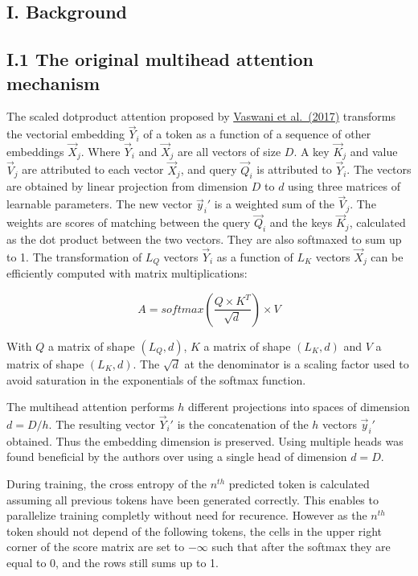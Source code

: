 \hypertarget{i.-background}{%
\subsection{I. Background}\label{i.-background}}

\hypertarget{i.1-the-original-multihead-attention-mechanism}{%
\subsection{I.1 The original multihead attention
mechanism}\label{i.1-the-original-multihead-attention-mechanism}}

The scaled dotproduct attention proposed by
\href{https://arxiv.org/abs/1706.03762}{Vaswani et al.~(2017)}
transforms the vectorial embedding \(\vec{Y}_i\) of a token as a
function of a sequence of other embeddings \(\vec{X}_j\). Where
\(\vec{Y}_i\) and \(\vec{X}_j\) are all vectors of size \(D\). A key
\(\vec{K}_j\) and value \(\vec{V}_j\) are attributed to each vector
\(\vec{X}_j\), and query \(\vec{Q}_i\) is attributed to \(\vec{Y}_i\).
The vectors are obtained by linear projection from dimension \(D\) to
\(d\) using three matrices of learnable parameters. The new vector
\(\vec{y}_i'\) is a weighted sum of the \(\vec{V}_j\). The weights are
scores of matching between the query \(\vec{Q}_i\) and the keys
\(\vec{K}_j\), calculated as the dot product between the two vectors.
They are also softmaxed to sum up to 1. The transformation of \(L_Q\)
vectors \(\vec{Y}_i\) as a function of \(L_K\) vectors \(\vec{X}_j\) can
be efficiently computed with matrix multiplications:

\[A = softmax\left(\frac{Q \times K^T}{\sqrt{d}}\right) \times V\]

With \(Q\) a matrix of shape \((L_Q, d)\), \(K\) a matrix of shape
\((L_K, d)\) and \(V\) a matrix of shape \((L_K, d)\). The \(\sqrt{d}\)
at the denominator is a scaling factor used to avoid saturation in the
exponentials of the softmax function.

The multihead attention performs \(h\) different projections into spaces
of dimension \(d = D/h\). The resulting vector \(\vec{Y}_i'\) is the
concatenation of the \(h\) vectors \(\vec{y}_i'\) obtained. Thus the
embedding dimension is preserved. Using multiple heads was found
beneficial by the authors over using a single head of dimension
\(d = D\).

During training, the cross entropy of the \(n^{th}\) predicted token is
calculated assuming all previous tokens have been generated correctly.
This enables to parallelize training completly without need for
recurence. However as the \(n^{th}\) token should not depend of the
following tokens, the cells in the upper right corner of the score
matrix are set to \(-\infty\) such that after the softmax they are equal
to 0, and the rows still sums up to 1.

